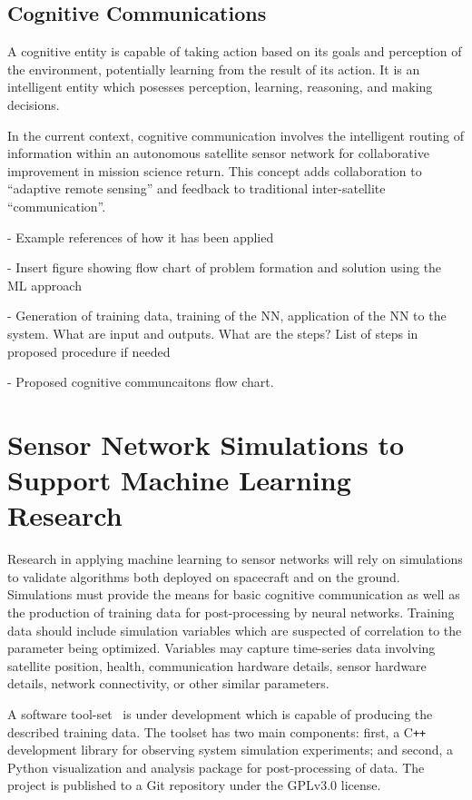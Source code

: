\documentclass[conference]{IEEEtran}
\newcommand{\project}{{\sc{Collaborate}}~}
\newcommand{\cpp}{C\texttt{++}~}
\begin{document}
\subsection{Cognitive Communications}

A cognitive entity is capable of taking action based on its goals and perception
of the environment, potentially learning from the result of its action.  It is
an intelligent entity which posesses perception, learning, reasoning, and making
decisions.

In the current context, cognitive communication involves the intelligent routing
of information within an autonomous satellite sensor network for collaborative
improvement in mission science return.  This concept adds collaboration to
``adaptive remote sensing'' and feedback to traditional inter-satellite
``communication''.

{
  \color{red}
  - Example references of how it has been applied

  - Insert figure showing flow chart of problem formation and solution using
  the ML approach

  - Generation of training data, training of the NN, application of the NN to
  the system. What are input and outputs. What are the steps? List of steps in
  proposed procedure if needed

  - Proposed cognitive communcaitons flow chart.
}
\vfill

\section{Sensor Network Simulations to Support Machine Learning Research}

Research in applying machine learning to sensor networks will rely on
simulations to validate algorithms both deployed on spacecraft and on the
ground.  Simulations must provide the means for basic cognitive communication as
well as the production of training data for post-processing by neural networks.
Training data should include simulation variables which are suspected of
correlation to the parameter being optimized.  Variables may capture time-series
data involving satellite position, health, communication hardware details,
sensor hardware details, network connectivity, or other similar parameters.

A software tool-set \project is under development which is capable of producing
the described training data.  The toolset has two main components: first, a \cpp
development library for observing system simulation experiments; and second, a
Python visualization and analysis package for post-processing of data.  The
project is published to a Git repository under the GPLv3.0 license.
\end{document}

